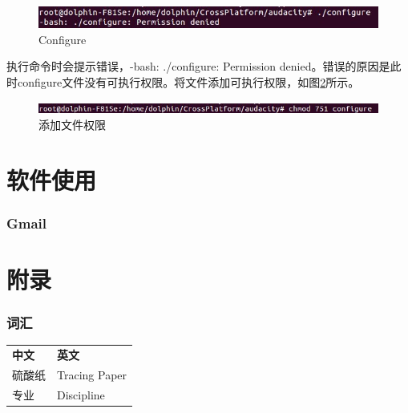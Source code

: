 \documentclass[paper=a4,fontsize=11pt]{article}
\begin{document}
	\begin{figure}[htbp]
		\centering
		\includegraphics[scale=0.8]{ConfigureCommand.jpeg}
		\caption{Configure}
		\label{ConfigureCommand}
	\end{figure}
	
	执行命令时会提示错误，-bash: ./configure: Permission denied。错误的原因是此时configure文件没有可执行权限。将文件添加可执行权限，如图\ref{ChangeModCommand}所示。	
	
	\begin{figure}[htbp]
		\centering
		\includegraphics[scale=0.8]{ChangeModCommand.jpeg}
		\caption{添加文件权限}
		\label{ChangeModCommand}
	\end{figure}
		
	\clearpage
	\part{软件使用}
	\clearpage
	\section{Gmail}
	
	
	
	
	\clearpage
	\part{附录}
	\clearpage
	\section{词汇}
	\begin{tabular}{ll}			
		\multirow{1}{*}{\textbf{中文}}			
		& \multicolumn{1}{l}{\textbf{英文}}\\			
		硫酸纸 & Tracing Paper\\
		专业 & Discipline\footnotemark[1]\\
	\end{tabular}
	\clearpage	
\end{document}
